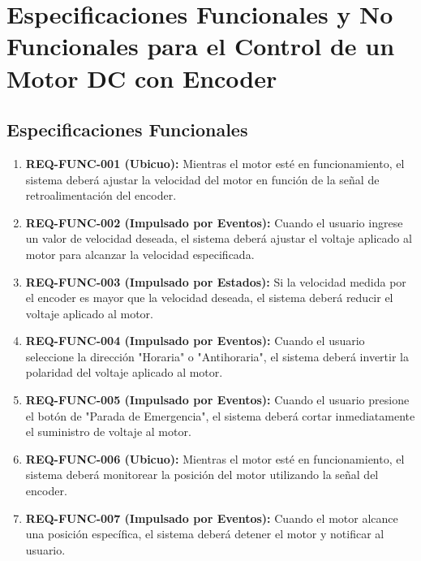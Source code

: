 \documentclass{article}
\begin{document}
\section*{Especificaciones Funcionales y No Funcionales para el Control de un Motor DC con Encoder}

\subsection*{Especificaciones Funcionales}
\begin{enumerate}
    \item \textbf{REQ-FUNC-001 (Ubicuo):} 
    Mientras el motor esté en funcionamiento, el sistema deberá ajustar la velocidad del motor en función de la señal de retroalimentación del encoder.

    \item \textbf{REQ-FUNC-002 (Impulsado por Eventos):} 
    Cuando el usuario ingrese un valor de velocidad deseada, el sistema deberá ajustar el voltaje aplicado al motor para alcanzar la velocidad especificada.

    \item \textbf{REQ-FUNC-003 (Impulsado por Estados):} 
    Si la velocidad medida por el encoder es mayor que la velocidad deseada, el sistema deberá reducir el voltaje aplicado al motor.

    \item \textbf{REQ-FUNC-004 (Impulsado por Eventos):} 
    Cuando el usuario seleccione la dirección "Horaria" o "Antihoraria", el sistema deberá invertir la polaridad del voltaje aplicado al motor.

    \item \textbf{REQ-FUNC-005 (Impulsado por Eventos):} 
    Cuando el usuario presione el botón de "Parada de Emergencia", el sistema deberá cortar inmediatamente el suministro de voltaje al motor.

    \item \textbf{REQ-FUNC-006 (Ubicuo):} 
    Mientras el motor esté en funcionamiento, el sistema deberá monitorear la posición del motor utilizando la señal del encoder.

    \item \textbf{REQ-FUNC-007 (Impulsado por Eventos):} 
    Cuando el motor alcance una posición específica, el sistema deberá detener el motor y notificar al usuario.
\end{enumerate}
\end{document}
